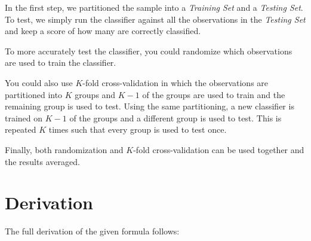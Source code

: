 \documentclass{article}
\begin{document}
In the first step, we partitioned the sample into a \emph{Training
  Set} and a \emph{Testing Set}.  To test, we simply run the
  classifier against all the observations in the \emph{Testing Set}
  and keep a score of how many are correctly classified.

To more accurately test the classifier, you could randomize which
observations are used to train the classifier.

You could also use $K$-fold cross-validation in which the observations
are partitioned into $K$ groups and $K-1$ of the groups are used to
train and the remaining group is used to test.  Using the same
partitioning, a new classifier is trained on $K-1$ of the groups and a
different group is used to test.  This is repeated $K$ times such that
every group is used to test once.

Finally, both randomization and $K$-fold cross-validation can be used
together and the results averaged.

\appendix
\section{Derivation}
\label{app:derivation}

The full derivation of the given formula follows:
\end{document}
